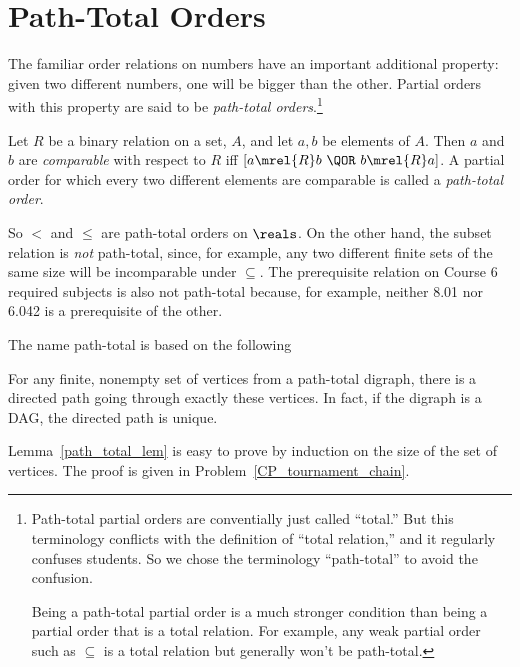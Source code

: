 \section{Path-Total Orders}

The familiar order relations on numbers have an important additional
property: given two different numbers, one will be bigger than the
other.  Partial orders with this property are said to be
\emph{path-total orders}.\footnote{Path-total partial orders are
  conventially just called ``total.''  But this terminology conflicts
  with the definition of ``total relation,'' and it regularly confuses
  students.  So we chose the terminology ``path-total'' to avoid the
  confusion.

  Being a path-total partial order is a much stronger condition than
  being a partial order that is a total relation.  For example, any
  weak partial order such as $\subseteq$ is a total relation but
  generally won't be path-total.}

\begin{definition}
Let $R$ be a binary relation on a set, $A$, and let $a, b$ be elements of
$A$.  Then $a$ and $b$ are \emph{comparable} with respect to $R$ iff $[a
  \mrel{R} b\ \QOR\ b \mrel{R} a]$.  A partial order for which every two
different elements are comparable is called a \emph{path-total order}.
\end{definition}

So $<$ and $\le$ are path-total orders on $\reals$.  On the other hand, the
subset relation is \emph{not} path-total, since, for example, any two different
finite sets of the same size will be incomparable under $\subseteq$.  The
prerequisite relation on Course 6 required subjects is also not path-total
because, for example, neither 8.01 nor 6.042 is a prerequisite of the
other.

The name path-total is based on the following
\begin{lemma}\label{path_total_lem} For any
  finite, nonempty set of vertices from a path-total digraph, there is
  a directed path going through exactly these vertices.  In fact, if
  the digraph is a DAG, the directed path is unique.
\end{lemma}
Lemma~\ref{path_total_lem} is easy to prove by induction on the size
of the set of vertices.  The proof is given in
Problem~\ref{CP_tournament_chain}.

\begin{problems}
\practiceproblems
{}

\classproblems
{}

\homeworkproblems
{}

\examproblems
{}

\end{problems}


